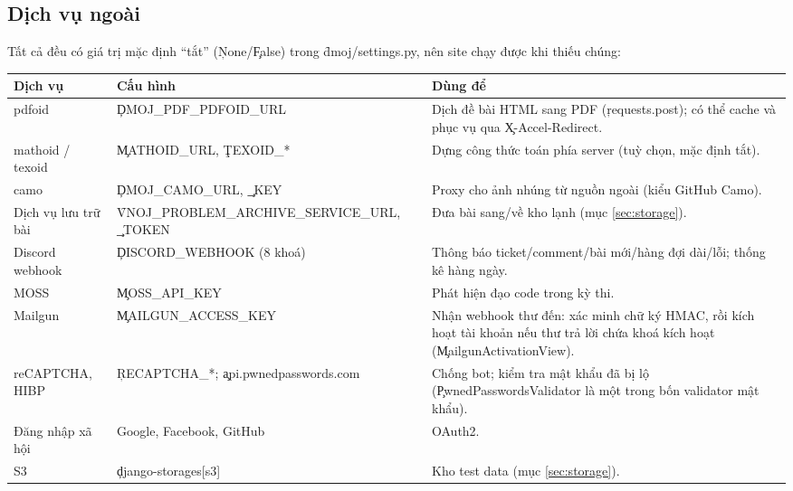 \subsection{Dịch vụ ngoài}\label{sec:external}
Tất cả đều có giá trị mặc định ``tắt'' (\c{None}/\c{False}) trong \f{dmoj/settings.py}, nên site chạy được khi thiếu chúng:
\begin{center}\small
\begin{tabularx}{\textwidth}{@{}L{3.1cm}L{4.5cm}Y@{}}
\toprule
Dịch vụ & Cấu hình & Dùng để \\
\midrule
pdfoid & \c{DMOJ_PDF_PDFOID_URL} & Dịch đề bài HTML sang PDF (\c{requests.post}); có thể cache và phục vụ qua \c{X-Accel-Redirect}. \\
mathoid / texoid & \c{MATHOID_URL}, \c{TEXOID_*} & Dựng công thức toán phía server (tuỳ chọn, mặc định tắt). \\
camo & \c{DMOJ_CAMO_URL}, \c{_KEY} & Proxy cho ảnh nhúng từ nguồn ngoài (kiểu GitHub Camo). \\
Dịch vụ lưu trữ bài & \f{VNOJ_PROBLEM_ARCHIVE_SERVICE_URL}, \c{_TOKEN} & Đưa bài sang/về kho lạnh (mục \ref{sec:storage}). \\
Discord webhook & \c{DISCORD_WEBHOOK} (8 khoá) & Thông báo ticket/comment/bài mới/hàng đợi dài/lỗi; thống kê hàng ngày. \\
MOSS & \c{MOSS_API_KEY} & Phát hiện đạo code trong kỳ thi. \\
Mailgun & \c{MAILGUN_ACCESS_KEY} & Nhận webhook thư đến: xác minh chữ ký HMAC, rồi kích hoạt tài khoản nếu thư trả lời chứa khoá kích hoạt (\c{MailgunActivationView}). \\
reCAPTCHA, HIBP & \c{RECAPTCHA_*}; \c{api.pwnedpasswords.com} & Chống bot; kiểm tra mật khẩu đã bị lộ (\c{PwnedPasswordsValidator} là một trong bốn validator mật khẩu). \\
Đăng nhập xã hội & Google, Facebook, GitHub & OAuth2. \\
S3 & \c{django-storages[s3]} & Kho test data (mục \ref{sec:storage}). \\
\bottomrule
\end{tabularx}
\end{center}
